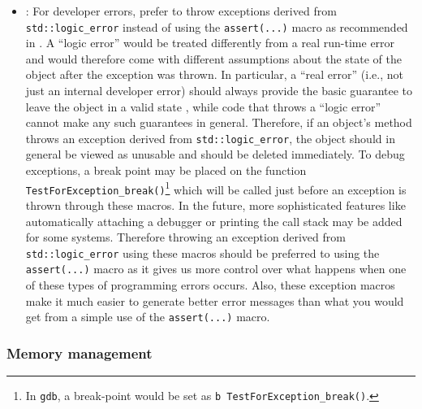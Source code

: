 \begin{itemize}

\item\GCGTestForException: For developer errors, prefer to throw
  exceptions derived from {}\texttt{std\-::logic\-\_error} instead of
  using the {}\texttt{assert(...)}  macro as recommended in
  {}\cite[Item 68]{C++CodingStandards05}.  A ``logic error'' would be
  treated differently from a real run-time error and would therefore
  come with different assumptions about the state of the object after
  the exception was thrown.  In particular, a ``real error'' (i.e.,
  not just an internal developer error) should always provide the
  basic guarantee to leave the object in a valid state \cite[Item
  71]{C++CodingStandards05}, while code that throws a ``logic error''
  cannot make any such guarantees in general.  Therefore, if an
  object's method throws an exception derived from
  \texttt{std\-::logic\-\_error}, the object should in general be
  viewed as unusable and should be deleted immediately.  To debug
  exceptions, a break point may be placed on the function
  {}\texttt{Test\-For\-Exception\-\_break()}\footnote{In
    {}\texttt{gdb}, a break-point would be set as {}\texttt{b
      Test\-For\-Exception\-\_break()}.} which will be called just
  before an exception is thrown through these macros.  In the future,
  more sophisticated features like automatically attaching a debugger
  or printing the call stack may be added for some systems.  Therefore
  throwing an exception derived from \texttt{std\-::logic\-\_error}
  using these macros should be preferred to using the
  {}\texttt{assert(...)} macro as it gives us more control over what
  happens when one of these types of programming errors occurs.  Also,
  these exception macros make it much easier to generate better error
  messages than what you would get from a simple use of the
  \texttt{assert(...)} macro.

\end{itemize}


%
\subsubsection{Memory management}
%


